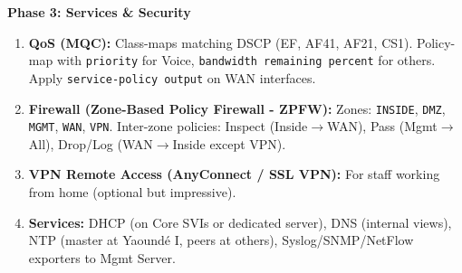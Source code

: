 \documentclass[11pt]{article}
\begin{document}
\begin{methode}
\textbf{Phase 3: Services \& Security}
\begin{enumerate}
    \item \textbf{QoS (MQC):} Class-maps matching DSCP (EF, AF41, AF21, CS1). Policy-map with \texttt{priority} for Voice, \texttt{bandwidth remaining percent} for others. Apply \texttt{service-policy output} on WAN interfaces.
    \item \textbf{Firewall (Zone-Based Policy Firewall - ZPFW):} Zones: \texttt{INSIDE}, \texttt{DMZ}, \texttt{MGMT}, \texttt{WAN}, \texttt{VPN}. Inter-zone policies: Inspect (Inside$\rightarrow$WAN), Pass (Mgmt$\rightarrow$All), Drop/Log (WAN$\rightarrow$Inside except VPN).
    \item \textbf{VPN Remote Access (AnyConnect / SSL VPN):} For staff working from home (optional but impressive).
    \item \textbf{Services:} DHCP (on Core SVIs or dedicated server), DNS (internal views), NTP (master at Yaoundé I, peers at others), Syslog/SNMP/NetFlow exporters to Mgmt Server.
\end{enumerate}
\end{methode}
\end{document}
